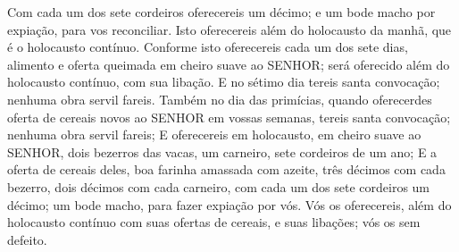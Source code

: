 {{  Com cada um dos sete cordeiros oferecereis um décimo;
  e um bode macho por expiação, para vos reconciliar.
  Isto oferecereis além do holocausto da manhã, que é o holocausto contínuo.
  Conforme isto oferecereis cada um dos sete dias, alimento e oferta queimada em cheiro suave ao SENHOR; será oferecido além do holocausto contínuo, com sua libação.
  E no sétimo dia tereis santa convocação; nenhuma obra servil fareis.
  Também no dia das primícias, quando oferecerdes oferta de cereais novos ao SENHOR em vossas semanas, tereis santa convocação; nenhuma obra servil fareis;
  E oferecereis em holocausto, em cheiro suave ao SENHOR, dois bezerros das vacas, um carneiro, sete cordeiros de um ano;
  E a oferta de cereais deles, boa farinha amassada com azeite, três décimos {} com cada bezerro, dois décimos com cada carneiro,
  com cada um dos sete cordeiros um décimo; %
  um bode macho, para fazer expiação por vós.
  Vós os oferecereis, além do holocausto contínuo com suas ofertas de cereais, e suas libações; vós os {} sem defeito}.
\par }

